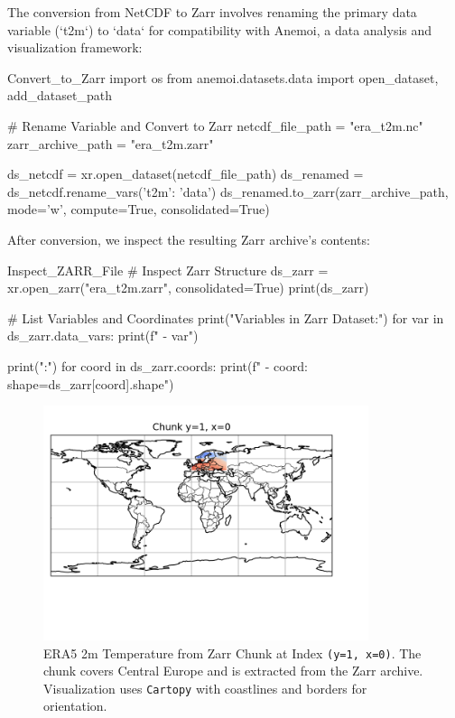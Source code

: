 The conversion from NetCDF to Zarr involves renaming the primary data variable (`t2m`) to `data` for compatibility with Anemoi, a data analysis and visualization framework:

\begin{codeonly}{Convert\_to\_Zarr}
import os
from anemoi.datasets.data import open_dataset, add_dataset_path

# Rename Variable and Convert to Zarr
netcdf_file_path = "era_t2m.nc"
zarr_archive_path = "era_t2m.zarr"

ds_netcdf = xr.open_dataset(netcdf_file_path)
ds_renamed = ds_netcdf.rename_vars({'t2m': 'data'})
ds_renamed.to_zarr(zarr_archive_path, mode='w', compute=True, consolidated=True)
\end{codeonly}

After conversion, we inspect the resulting Zarr archive's contents:

\begin{codeonly}{Inspect\_ZARR\_File}
# Inspect Zarr Structure
ds_zarr = xr.open_zarr("era_t2m.zarr", consolidated=True)
print(ds_zarr)

# List Variables and Coordinates
print("Variables in Zarr Dataset:")
for var in ds_zarr.data_vars:
    print(f" - {var}")

print("\nCoordinates:")
for coord in ds_zarr.coords:
    print(f" - {coord}: shape={ds_zarr[coord].shape}")
\end{codeonly}

%
\begin{figure}[ht]
    \centering
    \includegraphics[width=0.85\textwidth]{images/era_zarr_1_0.png}
    \caption{ERA5 2m Temperature from Zarr Chunk at Index \texttt{(y=1, x=0)}.
    The chunk covers Central Europe and is extracted from the Zarr archive.
    Visualization uses \texttt{Cartopy} with coastlines and borders for orientation.}
    \label{fig:era-zarr-chunk-1-0}
\end{figure}


